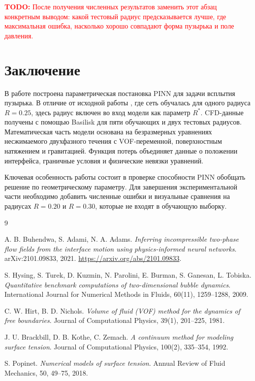 \documentclass[12pt,a4paper]{article}
\newcommand{\todo}[1]{%
    \par\noindent\textcolor{red}{\textbf{TODO:} #1}\par
}
\begin{document}
\todo{После получения численных результатов заменить этот абзац конкретным
выводом: какой тестовый радиус предсказывается лучше, где максимальная ошибка,
насколько хорошо совпадают форма пузырька и поле давления.}

\section{Заключение}

В работе построена параметрическая постановка PINN для задачи всплытия пузырька.
В отличие от исходной работы \cite{Buhendwa2021}, где сеть обучалась для одного
радиуса \(R=0.25\), здесь радиус включен во вход модели как параметр \(R^*\).
CFD-данные получены с помощью Basilisk для пяти обучающих и двух тестовых
радиусов. Математическая часть модели основана на безразмерных уравнениях
несжимаемого двухфазного течения с VOF-переменной, поверхностным натяжением и
гравитацией. Функция потерь объединяет данные о положении интерфейса,
граничные условия и физические невязки уравнений.

Ключевая особенность работы состоит в проверке способности PINN обобщать решение
по геометрическому параметру. Для завершения экспериментальной части необходимо
добавить численные ошибки и визуальные сравнения на радиусах \(R=0.20\) и
\(R=0.30\), которые не входят в обучающую выборку.

\begin{thebibliography}{9}

A. B. Buhendwa, S. Adami, N. A. Adams.
\textit{Inferring incompressible two-phase flow fields from the interface motion
using physics-informed neural networks}.
arXiv:2101.09833, 2021.
\url{https://arxiv.org/abs/2101.09833}.

S. Hysing, S. Turek, D. Kuzmin, N. Parolini, E. Burman, S. Ganesan, L. Tobiska.
\textit{Quantitative benchmark computations of two-dimensional bubble dynamics}.
International Journal for Numerical Methods in Fluids, 60(11), 1259--1288, 2009.

C. W. Hirt, B. D. Nichols.
\textit{Volume of fluid (VOF) method for the dynamics of free boundaries}.
Journal of Computational Physics, 39(1), 201--225, 1981.

J. U. Brackbill, D. B. Kothe, C. Zemach.
\textit{A continuum method for modeling surface tension}.
Journal of Computational Physics, 100(2), 335--354, 1992.

S. Popinet.
\textit{Numerical models of surface tension}.
Annual Review of Fluid Mechanics, 50, 49--75, 2018.

\end{thebibliography}
\end{document}
